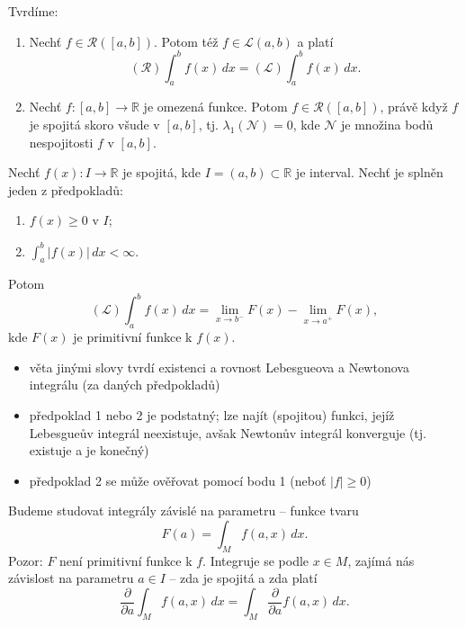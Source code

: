 \begin{poznamka}
Tvrdíme:
\begin{enumerate}[1.]
\item Nechť $f \in \mathcal{R}([a, b])$. Potom též $f \in \mathcal{L}(a, b)$
a platí
\[
(\mathscr{R}) \int_a^b f(x) \, dx
= (\mathscr{L}) \int_a^b f(x) \, dx.
\]

\item Nechť $f : [a, b] \to \mathbb{R}$ je omezená funkce. Potom
$f \in \mathcal{R}([a, b])$, právě když $f$ je spojitá skoro všude v
$[a, b]$, tj. $\lambda_1(\mathcal{N}) = 0$, kde $\mathcal{N}$ je
množina bodů nespojitosti $f$ v $[a, b]$.
\end{enumerate}
\end{poznamka}

\begin{veta}
Nechť $f(x) : I \to \mathbb{R}$ je spojitá, kde $I = (a, b) \subset
\mathbb{R}$ je interval. Nechť je splněn jeden z předpokladů:
\begin{enumerate}[1.]
\item $f(x) \ge 0$ v $I$;
\item $\int_a^b |f(x)| \, dx < \infty$.
\end{enumerate}
Potom
\[
(\mathscr{L}) \int_a^b f(x) \, dx
= \lim_{x \to b^-} F(x) - \lim_{x \to a^+} F(x),
\]
kde $F(x)$ je primitivní funkce k $f(x)$.
\end{veta}

\begin{poznamka}
\begin{itemize}
\item věta jinými slovy tvrdí existenci a rovnost Lebesgueova a
Newtonova integrálu (za daných předpokladů)
\item předpoklad 1 nebo 2 je podstatný; lze najít (spojitou) funkci,
jejíž Lebesgueův integrál neexistuje, avšak Newtonův integrál
konverguje (tj. existuje a je konečný)
\item předpoklad 2 se může ověřovat pomocí bodu 1 (neboť $|f| \ge 0$)
\end{itemize}
\end{poznamka}

\begin{poznamka}
Budeme studovat integrály závislé na parametru -- funkce tvaru
\[
F(a) = \int_M f(a, x) \, dx.
\]
Pozor: $F$ není primitivní funkce k $f$. Integruje se podle
$x \in M$, zajímá nás závislost na parametru $a \in I$ -- zda je
spojitá a zda platí
\[
\frac{\partial}{\partial a} \int_M f(a, x) \, dx
= \int_M \frac{\partial}{\partial a} f(a, x) \, dx.
\]
\end{poznamka}

